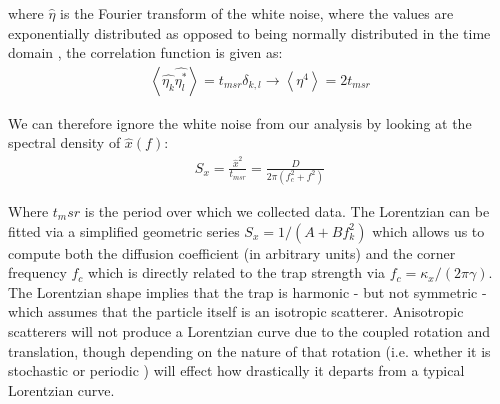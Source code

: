 where $\hat{\eta}$ is the Fourier transform of the white noise, 
where the values are exponentially distributed as opposed to being 
normally distributed in the time domain \cite{BergSoerensen2004}, 
the correlation function is given as:
\begin{align}
	\left<\hat{\eta_k}\hat{\eta_l^*}\right> = t_{msr} \delta_{k,l} \rightarrow \left< \eta^4 \right> = 2t_{msr}
\end{align} 

We can therefore ignore the white noise from our analysis by looking 
at the spectral density of $\hat{x}(f)$: 
\begin{align}
	\label{eq:lorentzian}
	S_x = \frac{\hat{x}^2}{t_{msr}} = \frac{D}{2\pi(f_c^2+f^2)}
\end{align}

Where $t_msr$ is the period over which we collected data. The Lorentzian 
can be fitted via a simplified geometric series $S_x = 1/(A+Bf_k^2)$ 
which allows us to compute both the diffusion coefficient (in arbitrary 
units) and the corner frequency $f_c$ which is directly related to 
the trap strength via $f_c = \kappa_x/(2\pi\gamma)$. The Lorentzian shape
implies that the trap is harmonic - but not symmetric - which assumes that 
the particle itself is an isotropic scatterer. Anisotropic scatterers will
not produce a Lorentzian curve due to the coupled rotation and translation, 
though depending on the nature of that rotation (i.e. whether it is stochastic
\cite{Bang2020} or periodic \cite{Yogesha2012}) will effect how drastically it 
departs from a typical Lorentzian curve.

